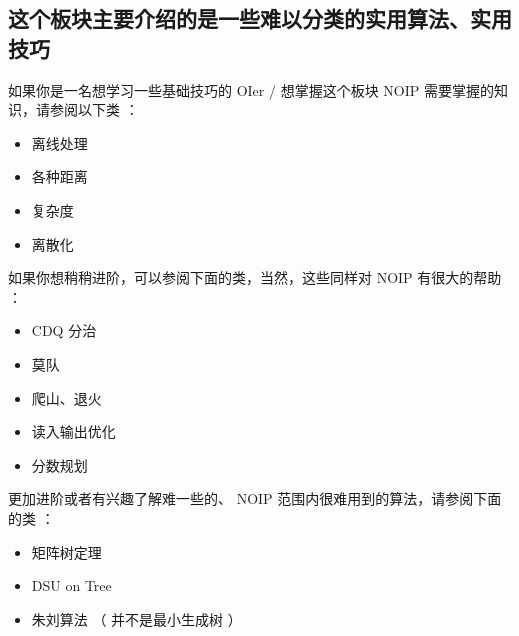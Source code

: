 
\subsection{这个板块主要介绍的是一些难以分类的实用算法、实用技巧}

如果你是一名想学习一些基础技巧的 OIer / 想掌握这个板块 NOIP 需要掌握的知识，请参阅以下类 ：

\begin{itemize}
\item 离线处理
\item 各种距离
\item 复杂度
\item 离散化
\end{itemize}

如果你想稍稍进阶，可以参阅下面的类，当然，这些同样对 NOIP 有很大的帮助 ：

\begin{itemize}
\item CDQ 分治
\item 莫队
\item 爬山、退火
\item 读入输出优化
\item 分数规划
\end{itemize}

更加进阶或者有兴趣了解难一些的、 NOIP 范围内很难用到的算法，请参阅下面的类 ：

\begin{itemize}
\item 矩阵树定理
\item DSU on Tree
\item 朱刘算法 （ 并不是最小生成树 ）
\end{itemize}
